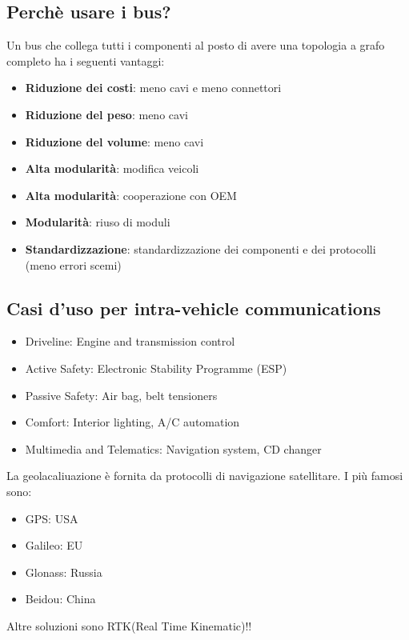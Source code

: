 \subsection{Perchè usare i bus?}
Un bus che collega tutti i componenti al posto di avere una topologia a grafo completo ha i seguenti vantaggi:
\begin{itemize}
	\item \textbf{Riduzione dei costi}: meno cavi e meno connettori
	\item \textbf{Riduzione del peso}: meno cavi
	\item \textbf{Riduzione del volume}: meno cavi
	\item \textbf{Alta modularità}: modifica veicoli
	\item \textbf{Alta modularità}: cooperazione con OEM
	\item \textbf{Modularità}: riuso di moduli
	\item \textbf{Standardizzazione}: standardizzazione dei componenti e dei protocolli (meno errori scemi)
\end{itemize}




\subsection{Casi d'uso per intra-vehicle communications}

\begin{itemize}
	\item Driveline: Engine and transmission control
	\item Active Safety: Electronic Stability Programme (ESP)
	\item Passive Safety: Air bag, belt tensioners
	\item Comfort: Interior lighting, A/C automation
	\item Multimedia and Telematics: Navigation system, CD changer
\end{itemize}

La geolacaliuazione è fornita da protocolli di navigazione satellitare. I più famosi sono:
\begin{itemize}
	\item GPS: USA
	\item Galileo: EU
	\item Glonass: Russia
	\item Beidou: China
\end{itemize}

Altre soluzioni sono RTK(Real Time Kinematic)!!



